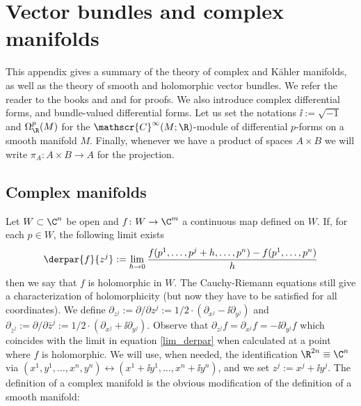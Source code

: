 \chapter{Vector bundles and complex manifolds} \label{appendix_Kahler}
This appendix gives a summary of the theory of complex and Kähler manifolds, as well as the theory of smooth and holomorphic vector bundles. We refer the reader to the books \parencite{lee_introCM} and \parencite{huybrechts2005complex} and \parencite[Ch. 10]{lee_introSM} for proofs. We also introduce complex differential forms, and bundle-valued differential forms. Let us set the notations \(\ii:=\sqrt{-1}\) and \(\Omega_\R^p(M)\) for the \(\mathscr{C}^\infty(M;\R)\)-module of differential \(p\)-forms on a smooth manifold \(M\). Finally, whenever we have a product of spaces \(A \times B\) we will write \(\pi_A\colon A \times B \to A\) for the projection.

\section{Complex manifolds} \label{section_complex_manifolds}
Let \(W \subset \C^n\) be open and \(f\colon W \to \C^m\) a continuous map defined on \(W\). If, for each \(p \in W\), the following limit exists
\begin{equation} \label{lim_derpar}
\derpar{f}{z^j}:=\lim_{h \to 0} \frac{f(p^1, \ldots , p^j+h, \ldots, p^n)-f(p^1, \ldots, p^n)}{h}
\end{equation}
then we say that \(f\) is holomorphic in \(W\). The Cauchy-Riemann equations still give a characterization of holomorphicity (but now they have to be satisfied for all coordinates). We define \(\partial_{z^j}:= \partial/\partial z^j:=1/2\cdot (\partial_{x^j}-\ii \partial_{y^j})\) and \(\partial_{\bar{z}^j}:= \partial/\partial \bar{z}^j:=1/2\cdot (\partial_{x^j}+\ii \partial_{y^j})\). Observe that \(\partial_{z^j}f=\partial_{x^j}f=-\ii \partial_{y^j}f\) which coincides with the limit in equation \eqref{lim_derpar} when calculated at a point where \(f\) is holomorphic. We will use, when needed, the identification \(\R^{2n} \equiv \C^n\) via \((x^1, y^1, \ldots , x^n, y^n) \leftrightarrow (x^1+\ii y^1, \ldots, x^n+\ii y^n)\), and we set \(z^j:=x^j + \ii y^j\). The definition of a complex manifold is the obvious modification of the definition of a smooth manifold:

